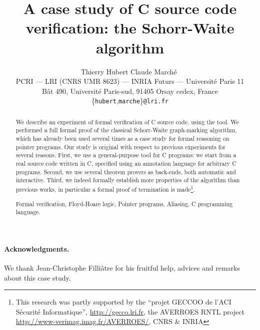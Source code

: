 \documentclass{ieee}
\begin{document}
\sloppy
{}

\title{A case study of C source code verification: the Schorr-Waite algorithm}
\author{~\hfill Thierry Hubert \hfill\hfill Claude March\'e \hfill~\\
PCRI --- LRI (CNRS UMR 8623) --- INRIA Futurs ---
  Universit\'e Paris 11 \\
B\^at 490, Universit\'e Paris-sud, 91405 Orsay cedex, France \\
\{\texttt{hubert},\texttt{marche}\}\texttt{@lri.fr} 
}
\maketitle



\begin{abstract}
  We describe an experiment of formal verification of C source code,
  using the \caduceus{} tool. We performed a full formal proof of the
  classical Schorr-Waite graph-marking algorithm, which has already
  been used several times as a case study for formal reasoning on
  pointer programs. Our study is original with respect to previous
  experiments for several reasons. First, we use a general-purpose
  tool for C programs: we start from a real source code written in C,
  specified using an annotation language for arbitrary C programs.
  Second, we use several theorem provers as back-ends, both automatic
  and interactive.  Third, we indeed formally establish more
  properties of the algorithm than previous works, in particular a
  formal proof of termination is made\footnote{This research was
    partly supported by the ``projet GECCOO de l'ACI S\'ecurit\'e
    Informatique'', \url{http://gecco.lri.fr}, the AVERROES RNTL
    project \url{http://www-verimag.imag.fr/AVERROES/}, CNRS \&
    INRIA}.


   Formal verification, Floyd-Hoare logic,
  Pointer programs, Aliasing, C programming language.

\bigskip

\end{abstract}







\bigskip
\paragraph{Acknowledgments.} 
We thank Jean-Christophe Filli\^atre for his fruitful help, advices and
remarks about this case study.



\end{document}
